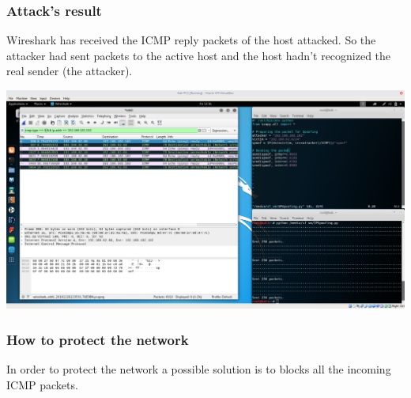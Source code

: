 \subsubsection{Attack's result}
Wireshark has received the ICMP reply packets of the host attacked. So the attacker had sent packets to the active host and the host hadn't recognized the real sender (the attacker).\par
\includegraphics[width=16cm]{img/IPSpoofingReply.png}

\subsubsection{How to protect the network}
In order to protect the network a possible solution is to blocks all the incoming ICMP packets.
